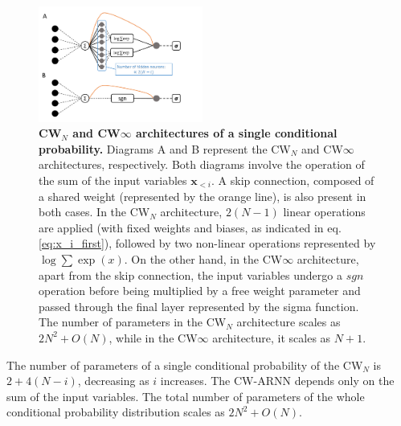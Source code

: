 \documentclass[aps,physrev,10pt,floatfix,reprint]{revtex4-2}
\begin{document}
\begin{figure}[!h]
    \centering 
    \includegraphics[width=0.48\textwidth]{img/CW_arch.pdf}
    \caption{\textbf{CW$_N$ and CW$\infty$ architectures of a single conditional probability.}  Diagrams A and B represent the CW$_N$ and CW$\infty$ architectures, respectively. Both diagrams involve the operation of the sum of the input variables $\mathbf{x}_{<i}$. A skip connection, composed of a shared weight (represented by the orange line), is also present in both cases. In the CW$_N$ architecture, $2(N-1)$ linear operations are applied (with fixed weights and biases, as indicated in eq.\ref{eq:x_i_first}), followed by two non-linear operations represented by $\log \sum \exp(x)$. On the other hand, in the CW$\infty$ architecture, apart from the skip connection, the input variables undergo a $sgn$ operation before being multiplied by a free weight parameter and passed through the final layer represented by the sigma function. The number of parameters in the CW$_N$ architecture scales as $2N^2+O(N)$, while in the CW$\infty$ architecture, it scales as $N+1$.}
    \label{fig:CW_arch}
\end{figure}

The number of parameters of a single conditional probability of the CW$_N$ is $2+4(N-i)$, decreasing as $i$ increases. %
The CW-ARNN depends only on the sum of the input variables.
The total number of parameters of the whole conditional probability distribution scales as $2N^2+ O(N)$. 
\end{document}

